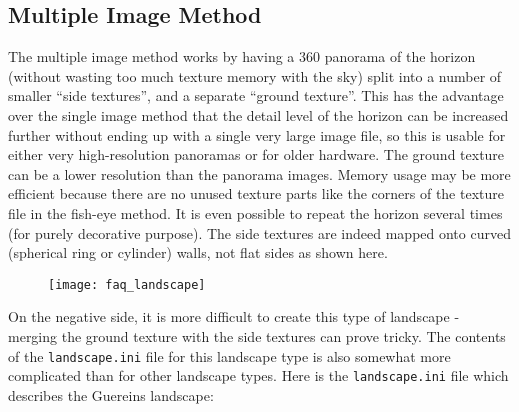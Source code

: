 \subsection{Multiple Image Method}\label{multiple-image-method}

The multiple image method works by having a 360 panorama of the horizon
(without wasting too much texture memory with the sky) split into a
number of smaller ``side textures'', and a separate ``ground texture''.
This has the advantage over the single image method that the detail
level of the horizon can be increased further without ending up with a
single very large image file, so this is usable for either very
high-resolution panoramas or for older hardware. The ground texture can
be a lower resolution than the panorama images. Memory usage may be more
efficient because there are no unused texture parts like the corners of
the texture file in the fish-eye method. It is even possible to repeat
the horizon several times (for purely decorative purpose). The side
textures are indeed mapped onto curved (spherical ring or cylinder)
walls, not flat sides as shown here.

\begin{figure}[h]
\centering\texttt{[image: faq\_landscape]}
\end{figure}

On the negative side, it is more difficult to create this type of
landscape - merging the ground texture with the side textures can prove
tricky. The contents of the \texttt{landscape.ini} file for this
landscape type is also somewhat more complicated than for other
landscape types. Here is the \texttt{landscape.ini} file which describes
the Guereins landscape:

